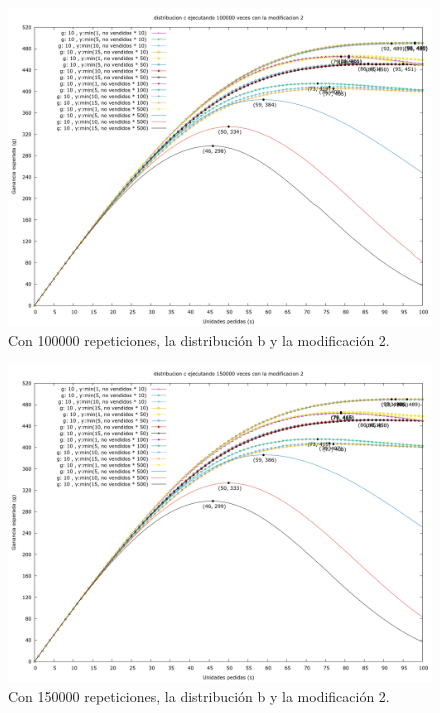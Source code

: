 \documentclass[12pt, spanish]{article}
\begin{document}
\begin{figure}[H]
	\centering
	\includegraphics[scale = 0.3]{prob_c/datos_c_100000_2.png}
	\caption{Con 100000 repeticiones, la distribución b y la modificación 2.}
	\label{fig:ej1_a_100000}

\end{figure}

\begin{figure}[H]
	\centering
	\includegraphics[scale = 0.3]{prob_c/datos_c_150000_2.png}
	\caption{Con 150000 repeticiones, la distribución b y la modificación 2.}
	\label{fig:ej1_a_150000}

\end{figure}
\end{document}
